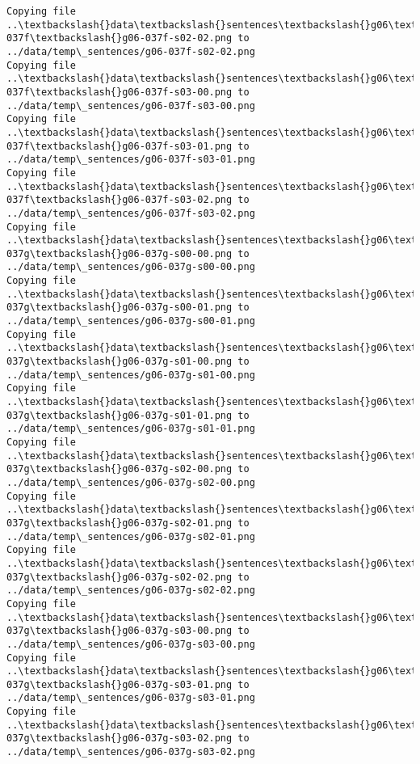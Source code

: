 \documentclass[11pt]{article}
\begin{document}
\begin{Verbatim}[commandchars=\\\{\}]
Copying file ..\textbackslash{}data\textbackslash{}sentences\textbackslash{}g06\textbackslash{}g06-037f\textbackslash{}g06-037f-s02-02.png to
../data/temp\_sentences/g06-037f-s02-02.png
Copying file ..\textbackslash{}data\textbackslash{}sentences\textbackslash{}g06\textbackslash{}g06-037f\textbackslash{}g06-037f-s03-00.png to
../data/temp\_sentences/g06-037f-s03-00.png
Copying file ..\textbackslash{}data\textbackslash{}sentences\textbackslash{}g06\textbackslash{}g06-037f\textbackslash{}g06-037f-s03-01.png to
../data/temp\_sentences/g06-037f-s03-01.png
Copying file ..\textbackslash{}data\textbackslash{}sentences\textbackslash{}g06\textbackslash{}g06-037f\textbackslash{}g06-037f-s03-02.png to
../data/temp\_sentences/g06-037f-s03-02.png
Copying file ..\textbackslash{}data\textbackslash{}sentences\textbackslash{}g06\textbackslash{}g06-037g\textbackslash{}g06-037g-s00-00.png to
../data/temp\_sentences/g06-037g-s00-00.png
Copying file ..\textbackslash{}data\textbackslash{}sentences\textbackslash{}g06\textbackslash{}g06-037g\textbackslash{}g06-037g-s00-01.png to
../data/temp\_sentences/g06-037g-s00-01.png
Copying file ..\textbackslash{}data\textbackslash{}sentences\textbackslash{}g06\textbackslash{}g06-037g\textbackslash{}g06-037g-s01-00.png to
../data/temp\_sentences/g06-037g-s01-00.png
Copying file ..\textbackslash{}data\textbackslash{}sentences\textbackslash{}g06\textbackslash{}g06-037g\textbackslash{}g06-037g-s01-01.png to
../data/temp\_sentences/g06-037g-s01-01.png
Copying file ..\textbackslash{}data\textbackslash{}sentences\textbackslash{}g06\textbackslash{}g06-037g\textbackslash{}g06-037g-s02-00.png to
../data/temp\_sentences/g06-037g-s02-00.png
Copying file ..\textbackslash{}data\textbackslash{}sentences\textbackslash{}g06\textbackslash{}g06-037g\textbackslash{}g06-037g-s02-01.png to
../data/temp\_sentences/g06-037g-s02-01.png
Copying file ..\textbackslash{}data\textbackslash{}sentences\textbackslash{}g06\textbackslash{}g06-037g\textbackslash{}g06-037g-s02-02.png to
../data/temp\_sentences/g06-037g-s02-02.png
Copying file ..\textbackslash{}data\textbackslash{}sentences\textbackslash{}g06\textbackslash{}g06-037g\textbackslash{}g06-037g-s03-00.png to
../data/temp\_sentences/g06-037g-s03-00.png
Copying file ..\textbackslash{}data\textbackslash{}sentences\textbackslash{}g06\textbackslash{}g06-037g\textbackslash{}g06-037g-s03-01.png to
../data/temp\_sentences/g06-037g-s03-01.png
Copying file ..\textbackslash{}data\textbackslash{}sentences\textbackslash{}g06\textbackslash{}g06-037g\textbackslash{}g06-037g-s03-02.png to
../data/temp\_sentences/g06-037g-s03-02.png

\end{Verbatim}
\end{document}
